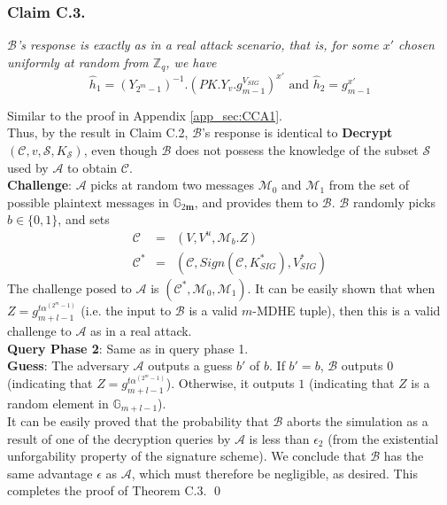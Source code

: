 \subsubsection{Claim C.3.} \textit{$\mathcal{B}$'s response is exactly as in a real attack scenario, that is, for some $x'$ chosen uniformly at random from $\mathbb{Z}_q$, we have} 
\begin{equation}
\hat{h}_1 = \left({Y_{2^m-1}}\right)^{-1}.\left(PK.Y_v.g^{V_{SIG}}_{m-1}\right)^{x'}  \text{ and }  \hat{h}_2 = g^{x'}_{m-1}\nonumber
\end{equation}

 Similar to the proof in Appendix \ref{app_sec:CCA1}.\\


\noindent Thus, by the result in Claim C.2, $\mathcal{B}$'s response is identical to \textbf{Decrypt}$(\mathcal{C},v,\mathcal{S},K_{\mathcal{S}})$, even though $\mathcal{B}$ does not possess the knowledge of the subset $\mathcal{S}$ used by $\mathcal{A}$ to obtain $\mathcal{C}$.\\
 
\noindent \textbf{Challenge}: $\mathcal{A}$ picks at random two messages $\mathcal{M}_0$ and $\mathcal{M}_1$ from the set of possible plaintext messages in $\mathbb{G}_{2\mathbf{m}}$, and provides them to $\mathcal{B}$. $\mathcal{B}$ randomly picks $b\in\{0,1\}$, and sets 
\begin{eqnarray}
 \mathcal{C}&=&(V,V^u,\mathcal{M}_b.Z) \nonumber\\
 \mathcal{C}^{*}&=&(\mathcal{C},Sign(\mathcal{C},K^{*}_{SIG}),V^{*}_{SIG})\nonumber
\end{eqnarray}
\noindent The challenge posed to $\mathcal{A}$ is $(\mathcal{C}^{*},\mathcal{M}_0,\mathcal{M}_1)$. It can be easily shown that when $Z=g^{t\alpha^{(2^m-1)}}_{m+l-1}$ (i.e. the input to $\mathcal{B}$ is a valid $m$-MDHE tuple), then this is a valid challenge to $\mathcal{A}$ as in a real attack.\\

\noindent\textbf{Query Phase 2}: Same as in query phase 1.\\
 
\noindent \textbf{Guess}: The adversary $\mathcal{A}$ outputs a guess $b'$ of $b$. If $b' = b$, $\mathcal{B}$ outputs $0$ (indicating that $Z=g^{t\alpha^{(2^m-1)}}_{m+l-1}$). Otherwise, it outputs $1$ (indicating that $Z$ is a random element in $\mathbb{G}_{m+l-1}$).\\

\noindent It can be easily proved that the probability that $\mathcal{B}$ aborts the simulation as a result of one of the decryption queries by $\mathcal{A}$ is less than $\epsilon_2$ (from the existential unforgability property of the signature scheme). We conclude that $\mathcal{B}$ has the same advantage $\epsilon$ as $\mathcal{A}$, which must therefore be negligible, as desired. This completes the proof of Theorem C.3. \hfill\qed

